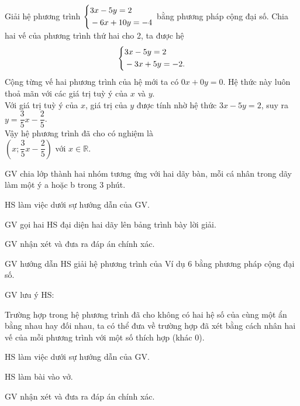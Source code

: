 \begin{vidu}
    Giải hệ phương trình $\left\{\begin{aligned}&3x - 5y = 2 \\ &-6x + 10y = -4\end{aligned}\right.$ bằng phương pháp cộng đại số.
    \doicot
    Chia hai vế của phương trình thứ hai cho 2, ta được hệ $$\left\{\begin{aligned}&3x - 5y = 2 \\ &-3x + 5y = -2.\end{aligned}\right.$$
    Cộng từng vế hai phương trình của hệ mới ta có $0x + 0y = 0$. Hệ thức này luôn thoả mãn với các giá trị tuỳ ý của $x$ và $y$.\\
    Với giá trị tuỳ ý của $x$, giá trị của $y$ được tính nhờ hệ thức $3x - 5y = 2$, suy ra $y = \dfrac{3}{5}x - \dfrac{2}{5}$.\\
    Vậy hệ phương trình đã cho có nghiệm là\\$\left( x; \dfrac{3}{5}x - \dfrac{2}{5} \right)$ với $x \in \mathbb{R}$.
\end{vidu}

\tochucthuchien

\begin{tcth}[luyentap=4]
    \buocmot
    \item GV chia lớp thành hai nhóm tương ứng với hai dãy bàn, mỗi cá nhân trong dãy làm một ý a hoặc b trong 3 phút.
    \buochai
    \item HS làm việc dưới sự hướng dẫn của GV. 
    \buocba
    \item GV gọi hai HS đại diện hai dãy lên bảng trình bày lời giải.
    \buocbon
    \item GV nhận xét và đưa ra đáp án chính xác.
\end{tcth}

\begin{tcth}[vidu=6]
    \buocmot
    \item GV hướng dẫn HS giải hệ phương trình của Ví dụ 6 bằng phương pháp cộng đại số. 
    \item GV lưu ý HS: 
    \begin{chuy}
        Trường hợp trong hệ phương trình đã cho không có hai hệ số của cùng một ẩn bằng nhau hay đối nhau, ta có thể đưa về trường hợp đã xét bằng cách nhân hai vế của mỗi phương trình với một số thích hợp (khác $0$).
    \end{chuy}
    \buochai
    \item HS làm việc dưới sự hướng dẫn của GV. 
    \buocba
    \item HS làm bài vào vở.
    \buocbon
    \item GV nhận xét và đưa ra đáp án chính xác.
\end{tcth}

